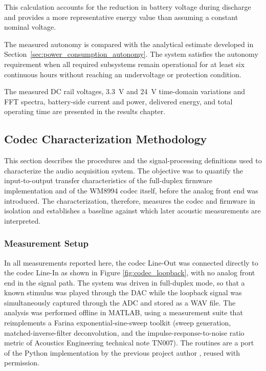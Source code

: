 This calculation accounts for the reduction in battery voltage during discharge and provides a more representative energy value than assuming a constant nominal voltage.

The measured autonomy is compared with the analytical estimate developed in Section~\ref{sec:power_consumption_autonomy}. The system satisfies the autonomy requirement when all required subsystems remain operational for at least six continuous hours without reaching an undervoltage or protection condition.

The measured DC rail voltages, 3.3~V and 24~V time-domain variations and FFT spectra, battery-side current and power, delivered energy, and total operating time are presented in the results chapter.

\subsection{Codec Characterization Methodology}
\label{sec:codec_char_method}

This section describes the procedures and the signal-processing definitions used to characterize the audio acquisition system. The objective was to quantify the input-to-output transfer characteristics of the full-duplex firmware implementation and of the WM8994 codec itself, before the analog front end was introduced. The characterization, therefore, measures the codec and firmware in isolation and establishes a baseline against which later acoustic measurements are interpreted.

\subsubsection{Measurement Setup}
\label{sec:char_setup}

In all measurements reported here, the codec Line-Out was connected directly to the codec Line-In as shown in Figure \ref{fig:codec_loopback}, with no analog front end in the signal path. The system was driven in full-duplex mode, so that a known stimulus was played through the DAC while the loopback signal was simultaneously captured through the ADC and stored as a WAV file. The analysis was performed offline in MATLAB, using a measurement suite that reimplements a Farina exponential-sine-sweep toolkit (sweep generation, matched-inverse-filter deconvolution, and the impulse-response-to-noise ratio metric of Acoustics Engineering technical note TN007). The routines are a port of the Python implementation by the previous project author \cite{IRThesisAndres}, reused with permission.

